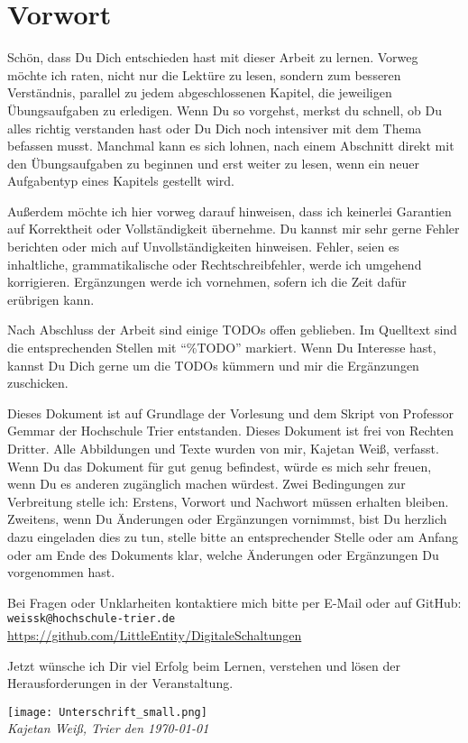 \chapter*{Vorwort}
Schön, dass Du Dich entschieden hast mit dieser Arbeit zu lernen. Vorweg möchte ich raten, nicht nur die Lektüre zu lesen, sondern zum besseren Verständnis, parallel zu jedem abgeschlossenen Kapitel, die jeweiligen Übungsaufgaben zu erledigen. Wenn Du so vorgehst, merkst du schnell, ob Du alles richtig verstanden hast oder Du Dich noch intensiver mit dem Thema befassen musst. Manchmal kann es sich lohnen, nach einem Abschnitt direkt mit den Übungsaufgaben zu beginnen und erst weiter zu lesen, wenn ein neuer Aufgabentyp eines Kapitels gestellt wird.

Außerdem möchte ich hier vorweg darauf hinweisen, dass ich keinerlei Garantien auf Korrektheit oder Vollständigkeit übernehme. Du kannst mir sehr gerne Fehler berichten oder mich auf Unvollständigkeiten hinweisen. Fehler, seien es inhaltliche, grammatikalische oder Rechtschreibfehler, werde ich umgehend korrigieren. Ergänzungen werde ich vornehmen, sofern ich die Zeit dafür erübrigen kann.

Nach Abschluss der Arbeit sind einige TODOs offen geblieben. Im Quelltext sind die entsprechenden Stellen mit "`\%TODO"' markiert. Wenn Du Interesse hast, kannst Du Dich gerne um die TODOs kümmern und mir die Ergänzungen zuschicken.

Dieses Dokument ist auf Grundlage der Vorlesung und dem Skript von Professor Gemmar der Hochschule Trier entstanden. Dieses Dokument ist frei von Rechten Dritter. Alle Abbildungen und Texte wurden von mir, Kajetan Weiß, verfasst. Wenn Du das Dokument für gut genug befindest, würde es mich sehr freuen, wenn Du es anderen zugänglich machen würdest. Zwei Bedingungen zur Verbreitung stelle ich: Erstens, Vorwort und Nachwort müssen erhalten bleiben. Zweitens, wenn Du Änderungen oder Ergänzungen vornimmst, bist Du herzlich dazu eingeladen dies zu tun, stelle bitte an entsprechender Stelle oder am Anfang oder am Ende des Dokuments klar, welche Änderungen oder Ergänzungen Du vorgenommen hast.

Bei Fragen oder Unklarheiten kontaktiere mich bitte per E-Mail oder auf GitHub: \\
\texttt{weissk@hochschule-trier.de} \\
\url{https://github.com/LittleEntity/DigitaleSchaltungen}

Jetzt wünsche ich Dir viel Erfolg beim Lernen, verstehen und lösen der Herausforderungen in der Veranstaltung.

\texttt{[image: Unterschrift\_small.png]}\\
\textsl{Kajetan Weiß, Trier den \today}
